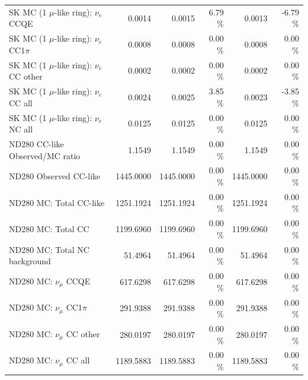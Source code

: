 \begin{table}
\begin{tabular}{| l | r | r  r | r  r |}
                             SK MC (1 $\mu$-like ring): $\nu_{e}$ CCQE &          0.0014 &          0.0015 &  6.79 \%  &          0.0013 & -6.79 \%  \\ 
                         SK MC (1 $\mu$-like ring): $\nu_{e}$ CC1$\pi$ &          0.0008 &          0.0008 &  0.00 \%  &          0.0008 &  0.00 \%  \\ 
                         SK MC (1 $\mu$-like ring): $\nu_{e}$ CC other &          0.0002 &          0.0002 &  0.00 \%  &          0.0002 &  0.00 \%  \\ 
                           SK MC (1 $\mu$-like ring): $\nu_{e}$ CC all &          0.0024 &          0.0025 &  3.85 \%  &          0.0023 & -3.85 \%  \\ 
                           SK MC (1 $\mu$-like ring): $\nu_{e}$ NC all &          0.0125 &          0.0125 &  0.00 \%  &          0.0125 &  0.00 \%  \\ 
\hline
                                       ND280 CC-like Observed/MC ratio &          1.1549 &          1.1549 &  0.00 \%  &          1.1549 &  0.00 \%  \\ 
                                                ND280 Observed CC-like &       1445.0000 &       1445.0000 &  0.00 \%  &       1445.0000 &  0.00 \%  \\ 
                                               ND280 MC: Total CC-like &       1251.1924 &       1251.1924 &  0.00 \%  &       1251.1924 &  0.00 \%  \\ 
                                                    ND280 MC: Total CC &       1199.6960 &       1199.6960 &  0.00 \%  &       1199.6960 &  0.00 \%  \\ 
                                         ND280 MC: Total NC background &         51.4964 &         51.4964 &  0.00 \%  &         51.4964 &  0.00 \%  \\ 
\hline
                                            ND280 MC: $\nu_{\mu}$ CCQE &        617.6298 &        617.6298 &  0.00 \%  &        617.6298 &  0.00 \%  \\ 
                                        ND280 MC: $\nu_{\mu}$ CC1$\pi$ &        291.9388 &        291.9388 &  0.00 \%  &        291.9388 &  0.00 \%  \\ 
                                        ND280 MC: $\nu_{\mu}$ CC other &        280.0197 &        280.0197 &  0.00 \%  &        280.0197 &  0.00 \%  \\ 
                                          ND280 MC: $\nu_{\mu}$ CC all &       1189.5883 &       1189.5883 &  0.00 \%  &       1189.5883 &  0.00 \%  \\ 

\end{tabular}
\end{table}
